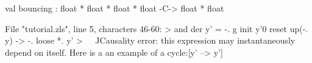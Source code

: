 \runverbatimfalse
{}
\begin{RunVerbatimMsg}
val bouncing : float * float * float * float -C-> float * float
\end{RunVerbatimMsg}
\begin{RunVerbatimErr}
File "tutorial.zls", line 5, characters 46-60:
> and der y' = -. g init y'0 reset up(-. y) -> -. loose *. y'
>                                              ^^^^^^^^^^^^^^
Causality error: this expression may instantaneously depend on itself.
Here is a an example of a cycle:[y' --> y']
\end{RunVerbatimErr}
